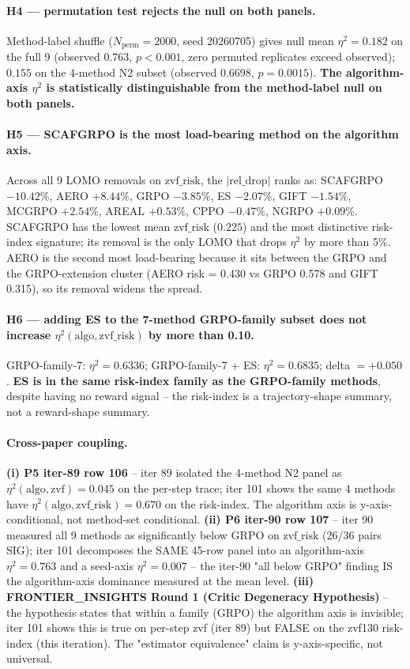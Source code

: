 \documentclass{article}  \usepackage[preprint,nonatbib]{neurips_2026} \usepackage[numbers]{natbib}
\begin{document}
\paragraph{H4 --- permutation test rejects the null on both panels.}
Method-label shuffle ($N_\mathrm{perm}{=}2000$, seed 20260705)
gives null mean $\eta^2 = 0.182$ on the full 9 (observed $0.763$,
$p < 0.001$, zero permuted replicates exceed observed);
$0.155$ on the 4-method N2 subset (observed $0.6698$, $p = 0.0015$).
\textbf{The algorithm-axis $\eta^2$ is statistically distinguishable
from the method-label null on both panels.}

\paragraph{H5 --- SCAFGRPO is the most load-bearing method on the
algorithm axis.}
Across all 9 LOMO removals on $\mathrm{zvf\_risk}$, the
$|\mathrm{rel\_drop}|$ ranks as: SCAFGRPO $-10.42\%$, AERO $+8.44\%$,
GRPO $-3.85\%$, ES $-2.07\%$, GIFT $-1.54\%$, MCGRPO $+2.54\%$,
AREAL $+0.53\%$, CPPO $-0.47\%$, NGRPO $+0.09\%$. SCAFGRPO has the
lowest mean $\mathrm{zvf\_risk}$ ($0.225$) and the most distinctive
risk-index signature; its removal is the only LOMO that drops
$\eta^2$ by more than 5\%. AERO is the second most load-bearing
because it sits between the GRPO and the GRPO-extension cluster
(AERO risk = 0.430 vs GRPO 0.578 and GIFT 0.315), so its removal
widens the spread.

\paragraph{H6 --- adding ES to the 7-method GRPO-family subset does
not increase $\eta^2(\mathrm{algo}, \mathrm{zvf\_risk})$ by more
than 0.10.}
GRPO-family-7: $\eta^2 = 0.6336$; GRPO-family-7 + ES: $\eta^2 =
0.6835$; delta $= +0.050$. \textbf{ES is in the same risk-index
family as the GRPO-family methods}, despite having no reward
signal -- the risk-index is a trajectory-shape summary, not a
reward-shape summary.

\paragraph{Cross-paper coupling.}
\textbf{(i) P5 iter-89 row 106} -- iter 89 isolated the 4-method
N2 panel as $\eta^2(\mathrm{algo}, \mathrm{zvf}) = 0.045$ on the
per-step trace; iter 101 shows the same 4 methods have
$\eta^2(\mathrm{algo}, \mathrm{zvf\_risk}) = 0.670$ on the
risk-index. The algorithm axis is y-axis-conditional, not method-set
conditional. \textbf{(ii) P6 iter-90 row 107} -- iter 90 measured
all 9 methods as significantly below GRPO on $\mathrm{zvf\_risk}$
(26/36 pairs SIG); iter 101 decomposes the SAME 45-row panel
into an algorithm-axis $\eta^2 = 0.763$ and a seed-axis
$\eta^2 = 0.007$ -- the iter-90 "all below GRPO" finding IS the
algorithm-axis dominance measured at the mean level. \textbf{(iii)
FRONTIER\_INSIGHTS Round 1 (Critic Degeneracy Hypothesis)} -- the
hypothesis states that within a family (GRPO) the algorithm axis
is invisible; iter 101 shows this is true on per-step zvf (iter
89) but FALSE on the zvf130 risk-index (this iteration). The
"estimator equivalence" claim is y-axis-specific, not universal.
\end{document}
